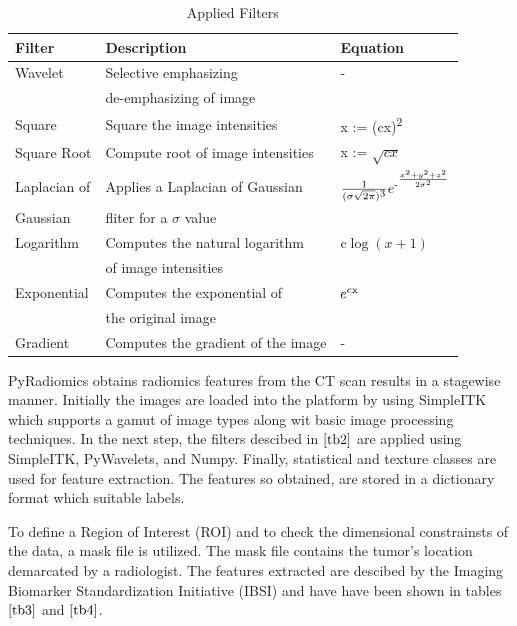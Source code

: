 \documentclass[final,1p,times,twocolumn]{elsarticle}
\newcommand\sufr[3][0pt]{$\rule{0pt}{\dimexpr#1+1.4ex\relax}^\frac{#2}{#3}$}
\begin{document}
\begin{table}[!b]
\scriptsize
\centering
\caption{Applied Filters}
\label{tb2}
\begin{tabular}{| l | l | l |}
\hline
\textbf{Filter} & \textbf{Description} & \textbf{Equation}\\
\hline
Wavelet & Selective emphasizing  & -\\
&de-emphasizing of image&\\
\hline
Square & Square the image intensities & x := (cx)\textsuperscript{2}\\
\hline
Square Root & Compute root of image intensities & x := $\sqrt{cx}$\\
\hline
Laplacian of & Applies a Laplacian of Gaussian & $\frac{1}{(\sigma\sqrt{2\pi})\textsuperscript{3}}e\textsuperscript{-\sufr{x\textsuperscript{2}+y\textsuperscript{2}+z\textsuperscript{2}}{2\sigma\textsuperscript{2}}}$\\
Gaussian &fliter for a $\sigma$ value&\\
\hline
Logarithm & Computes the natural logarithm& c$\log(x+1)$\\
& of image intensities &\\
\hline
Exponential & Computes the exponential of & $e\textsuperscript{cx}$\\
&the original image &\\
\hline
Gradient & Computes the gradient of the image & -\\
\hline
\end{tabular}
\end{table}

PyRadiomics obtains radiomics features from the CT scan results in a stagewise manner. Initially the images are loaded into the platform by using SimpleITK which supports a gamut of image types along wit basic image processing techniques. In the next step, the filters descibed in $\ref{tb2}$ are applied using SimpleITK, PyWavelets, and Numpy. Finally, statistical and texture classes are used for feature extraction. The features so obtained, are stored in a dictionary format which suitable labels. 

To define a Region of Interest (ROI) and to check the dimensional constrainsts of the data, a mask file is utilized. The mask file contains the tumor's location demarcated by a radiologist. The features extracted are descibed by the Imaging Biomarker Standardization Initiative (IBSI) and have have been shown in tables $\ref{tb3}$ and $\ref{tb4}$.
\end{document}
